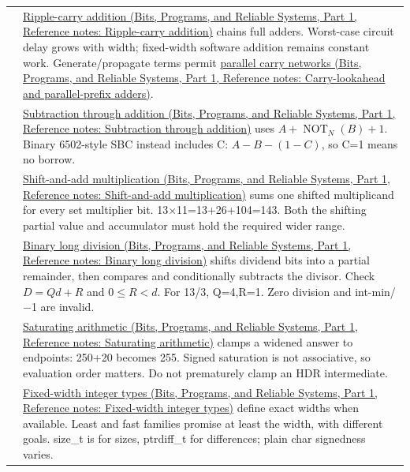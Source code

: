 {\begin{longtable}[]{@{}
  >{\raggedright\arraybackslash}p{}
  >{\raggedright\arraybackslash}p{}@{}}
33 & \href{../01-Bits-Programs-and-Reliable-Systems-P01/main.pdf\#appendix-17917d9fdbe3}{Ripple-carry addition (Bits, Programs, and Reliable Systems, Part 1, Reference notes: Ripple-carry addition)} chains full adders. Worst-case circuit delay grows with width; fixed-width software addition remains constant work. Generate/propagate terms permit \href{../01-Bits-Programs-and-Reliable-Systems-P01/main.pdf\#appendix-b5c46b2d94ff}{parallel carry networks (Bits, Programs, and Reliable Systems, Part 1, Reference notes: Carry-lookahead and parallel-prefix adders)}. \\
34 & \href{../01-Bits-Programs-and-Reliable-Systems-P01/main.pdf\#appendix-1c7df340573e}{Subtraction through addition (Bits, Programs, and Reliable Systems, Part 1, Reference notes: Subtraction through addition)} uses \(A+\operatorname{NOT}_N(B)+1\). Binary 6502-style SBC instead includes C: \(A-B-(1-C)\), so C=1 means no borrow. \\
35 & \href{../01-Bits-Programs-and-Reliable-Systems-P01/main.pdf\#appendix-a65290d66ed9}{Shift-and-add multiplication (Bits, Programs, and Reliable Systems, Part 1, Reference notes: Shift-and-add multiplication)} sums one shifted multiplicand for every set multiplier bit. 13×11=13+26+104=143. Both the shifting partial value and accumulator must hold the required wider range. \\
36 & \href{../01-Bits-Programs-and-Reliable-Systems-P01/main.pdf\#appendix-89985e6a2685}{Binary long division (Bits, Programs, and Reliable Systems, Part 1, Reference notes: Binary long division)} shifts dividend bits into a partial remainder, then compares and conditionally subtracts the divisor. Check \(D=Qd+R\) and \(0\le R<d\). For 13/3, Q=4,R=1. Zero division and int-min/−1 are invalid. \\
37 & \href{../01-Bits-Programs-and-Reliable-Systems-P01/main.pdf\#appendix-3999c6209649}{Saturating arithmetic (Bits, Programs, and Reliable Systems, Part 1, Reference notes: Saturating arithmetic)} clamps a widened answer to endpoints: 250+20 becomes 255. Signed saturation is not associative, so evaluation order matters. Do not prematurely clamp an HDR intermediate. \\
38 & \href{../01-Bits-Programs-and-Reliable-Systems-P01/main.pdf\#appendix-cc04044b5782}{Fixed-width integer types (Bits, Programs, and Reliable Systems, Part 1, Reference notes: Fixed-width integer types)} define exact widths when available. Least and fast families promise at least the width, with different goals. size\_t is for sizes, ptrdiff\_t for differences; plain char signedness varies. \\

\end{longtable}}
